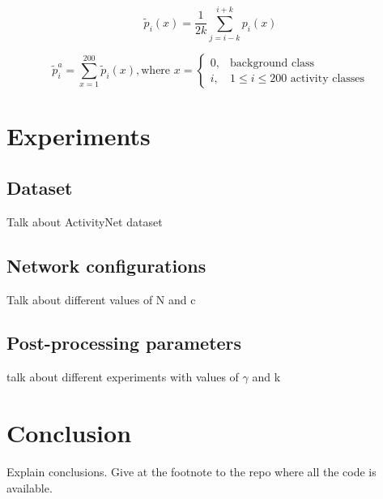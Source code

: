\documentclass{article}
\begin{document}
\begin{equation}
	\tilde{p}_i(x) = \frac{1}{2k} \sum_{j=i-k}^{i+k} p_i(x)
    \label{eq:smooth}
\end{equation}

\begin{equation}
    \label{eq:activity_probability}
	\tilde{p}^a_i = \sum_{x=1}^{200}\tilde{p}_i(x), \text{where } x = \begin{cases}
        0, & \text{background class} \\
        i, & 1 \leq i \leq 200 \text{ activity classes}
    \end{cases}
\end{equation}

\section{Experiments}

\subsection{Dataset}

Talk about ActivityNet dataset

\subsection{Network configurations}

Talk about different values of N and c

\subsection{Post-processing parameters}

talk about different experiments with values of $\gamma$ and k

\section{Conclusion}

Explain conclusions. Give at the footnote to the repo where all the code is available.



\section*{}
{\small


}
\end{document}
